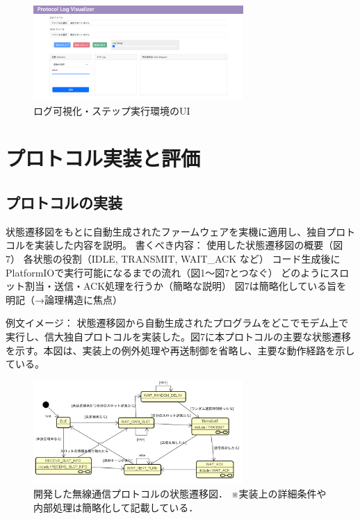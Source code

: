 \documentclass[technicalreport]{ieicej}
\begin{document}
  \begin{figure}[tb]
    \centering
    \includegraphics[width=80mm]{./images/viewer_ui.png}
    \caption{ログ可視化・ステップ実行環境のUI}
    \label{fig:viewer-ui}
  \end{figure}


\section{プロトコル実装と評価}

\subsection{プロトコルの実装}
状態遷移図をもとに自動生成されたファームウェアを実機に適用し、独自プロトコルを実装した内容を説明。
書くべき内容：
使用した状態遷移図の概要（図7）
各状態の役割（IDLE, TRANSMIT, WAIT\_ACK など）
コード生成後にPlatformIOで実行可能になるまでの流れ（図1〜図7とつなぐ）
どのようにスロット割当・送信・ACK処理を行うか（簡略な説明）
図7は簡略化している旨を明記（→論理構造に焦点）

例文イメージ：
状態遷移図から自動生成されたプログラムをどこでモデム上で実行し、信大独自プロトコルを実装した。図7に本プロトコルの主要な状態遷移を示す。本図は、実装上の例外処理や再送制御を省略し、主要な動作経路を示している。
\begin{figure}[b]
  \centering
  \includegraphics[width=80mm]{./images/protocol-state-machine3.png}
  \caption{開発した無線通信プロトコルの状態遷移図．
※実装上の詳細条件や内部処理は簡略化して記載している．}
  \label{fig:protocol-state-machine}
\end{figure}
\end{document}
